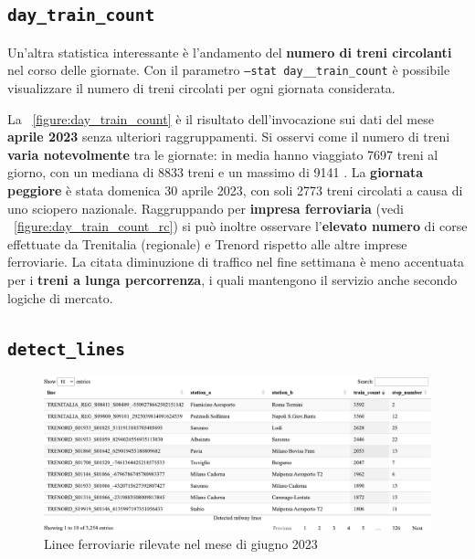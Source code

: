 \documentclass[12pt,italian]{report}
\begin{document}
\subsection{\texttt{day\_train\_count}}
\label{stat_day_train_count}

Un'altra statistica interessante è l'andamento del \textbf{numero di
    treni circolanti} nel corso delle giornate.  Con il parametro
\texttt{--stat day\_\-\_train\_\-count} è possibile visualizzare il
numero di treni circolati per ogni giornata considerata.

La \figurename~\ref{figure:day_train_count} è il risultato
dell'invocazione sui dati del mese \textbf{aprile 2023} senza
ulteriori raggruppamenti.  Si osservi come il numero di treni
\textbf{varia notevolmente} tra le giornate: in media hanno viaggiato
7697 treni al giorno, con un mediana di 8833 treni e un massimo di
9141 \cite[D]{StatJup}.  La \textbf{giornata peggiore} è stata
domenica 30 aprile 2023, con soli 2773 treni circolati a causa di uno
sciopero nazionale.  Raggruppando per \textbf{impresa ferroviaria}
(vedi \figurename~\ref{figure:day_train_count_rc}) si può inoltre
osservare l'\textbf{elevato numero} di corse effettuate da Trenitalia
(regionale) e Trenord rispetto alle altre imprese ferroviarie.  La
citata diminuzione di traffico nel fine settimana è meno accentuata
per i \textbf{treni a lunga percorrenza}, i quali mantengono il
servizio anche secondo logiche di mercato.

\subsection{\texttt{detect\_lines}}

\begin{figure}[h]
    \includegraphics[width=1\textwidth]{images/detect_lines.pdf}
    \caption{Linee ferroviarie rilevate nel mese di giugno 2023}
    \label{figure:detect_lines}
\end{figure}
\end{document}
